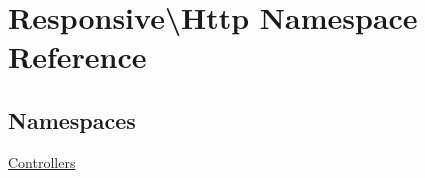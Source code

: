 \hypertarget{namespace_responsive_1_1_http}{}\section{Responsive\textbackslash{}Http Namespace Reference}
\label{namespace_responsive_1_1_http}
\subsection*{Namespaces}
\begin{DoxyCompactItemize}
\item 
 \mbox{\hyperlink{namespace_responsive_1_1_http_1_1_controllers}{Controllers}}
\end{DoxyCompactItemize}
